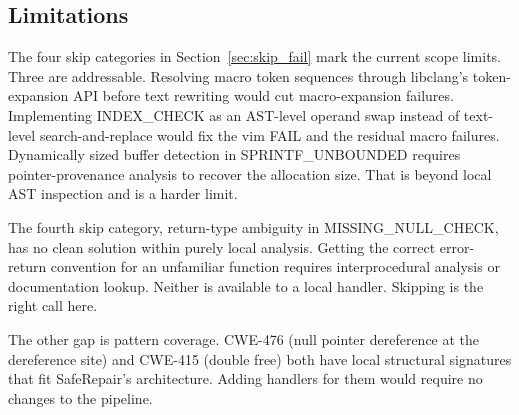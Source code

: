 \subsection{Limitations}

The four skip categories in Section~\ref{sec:skip_fail} mark the current scope limits. Three are addressable. Resolving macro token sequences through libclang's token-expansion API before text rewriting would cut macro-expansion failures. Implementing INDEX\_CHECK as an AST-level operand swap instead of text-level search-and-replace would fix the vim FAIL and the residual macro failures. Dynamically sized buffer detection in SPRINTF\_UNBOUNDED requires pointer-provenance analysis to recover the allocation size. That is beyond local AST inspection and is a harder limit.

The fourth skip category, return-type ambiguity in MISSING\_NULL\_CHECK, has no clean solution within purely local analysis. Getting the correct error-return convention for an unfamiliar function requires interprocedural analysis or documentation lookup. Neither is available to a local handler. Skipping is the right call here.

The other gap is pattern coverage. CWE-476 (null pointer dereference at the dereference site) and CWE-415 (double free) both have local structural signatures that fit SafeRepair's architecture. Adding handlers for them would require no changes to the pipeline.
